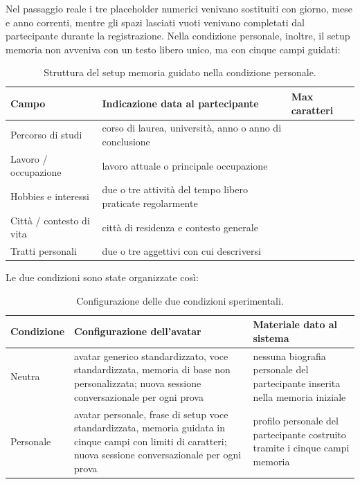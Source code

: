 Nel passaggio reale i tre placeholder numerici venivano sostituiti con giorno, mese e anno correnti, mentre gli spazi lasciati vuoti venivano completati dal partecipante durante la registrazione. Nella condizione personale, inoltre, il setup memoria non avveniva con un testo libero unico, ma con cinque campi guidati:

\begin{table}[H]
\centering
\small
\begin{tabularx}{0.92\textwidth}{>{\raggedright\arraybackslash}p{}X>{\raggedleft\arraybackslash}p{}}
\hline
\textbf{Campo} & \textbf{Indicazione data al partecipante} & \textbf{Max caratteri} \\
\hline
Percorso di studi & corso di laurea, università, anno o anno di conclusione & 200 \\
Lavoro / occupazione & lavoro attuale o principale occupazione & 150 \\
Hobbies e interessi & due o tre attività del tempo libero praticate regolarmente & 200 \\
Città / contesto di vita & città di residenza e contesto generale & 150 \\
Tratti personali & due o tre aggettivi con cui descriversi & 100 \\
\hline
\end{tabularx}
\caption{Struttura del setup memoria guidato nella condizione personale.}
\label{tab:empirical-memory-setup}
\end{table}

Le due condizioni sono state organizzate così:

\begin{table}[H]
\centering
\small
\begin{tabularx}{\textwidth}{>{\raggedright\arraybackslash}p{}X X}
\hline
\textbf{Condizione} & \textbf{Configurazione dell'avatar} & \textbf{Materiale dato al sistema} \\
\hline
Neutra & avatar generico standardizzato, voce standardizzata, memoria di base non personalizzata; nuova sessione conversazionale per ogni prova & nessuna biografia personale del partecipante inserita nella memoria iniziale \\
Personale & avatar personale, frase di setup voce standardizzata, memoria guidata in cinque campi con limiti di caratteri; nuova sessione conversazionale per ogni prova & profilo personale del partecipante costruito tramite i cinque campi memoria \\
\hline
\end{tabularx}
\caption{Configurazione delle due condizioni sperimentali.}
\label{tab:empirical-conditions}
\end{table}


